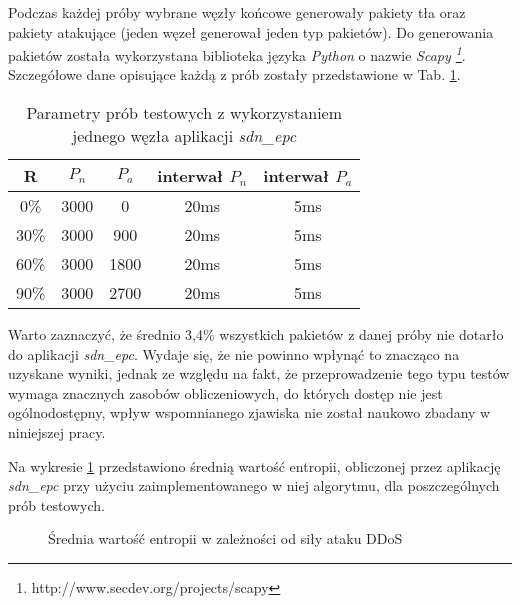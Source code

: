 Podczas każdej próby wybrane węzły końcowe generowały pakiety tła oraz
pakiety atakujące (jeden węzeł generował jeden typ pakietów). Do generowania
pakietów została wykorzystana biblioteka języka \textit{Python} o nazwie
\textit{ Scapy \footnote{http://www.secdev.org/projects/scapy}}. Szczegółowe
dane opisujące każdą z prób zostały przedstawione w Tab. \ref{tab:entropy}.

\begin{table}[h!]
\centering
\begin{tabular}{ |c|c|c|c|c| } 
 \hline
 R & $P_{n}$ & $P_{a}$ & interwał $P_{n}$ & interwał $P_{a}$ \\
 \hline
 0\% & 3000 & 0 & 20ms & 5ms \\ 
 \hline
 30\% & 3000 & 900 & 20ms & 5ms \\ 
 \hline
 60\% & 3000 & 1800 & 20ms & 5ms \\ 
 \hline
 90\% & 3000 & 2700 & 20ms & 5ms \\ 
 \hline
\end{tabular}
\caption{Parametry prób testowych z wykorzystaniem jednego węzła aplikacji
  \textit{sdn\_epc}} 
\label{tab:entropy}
\end{table}

Warto zaznaczyć, że średnio 3,4\% wszystkich pakietów z danej próby nie dotarło
do aplikacji \textit{sdn\_epc}. Wydaje się, że nie powinno wpłynąć to znacząco
na uzyskane wyniki, jednak ze względu na fakt, że przeprowadzenie tego typu
testów wymaga znacznych zasobów obliczeniowych, do których dostęp nie jest
ogólnodostępny, wpływ wspomnianego zjawiska nie został naukowo zbadany w
niniejszej pracy.

Na wykresie \ref{plot:entropy} przedstawiono średnią wartość entropii,
obliczonej przez aplikację \textit{sdn\_epc} przy użyciu zaimplementowanego w
niej algorytmu, dla poszczególnych prób testowych.

\begin{figure}[h]
\centering
{}
\caption{Średnia wartość entropii w zależności od siły ataku DDoS}
\label{plot:entropy}
\end{figure}
\newpage

